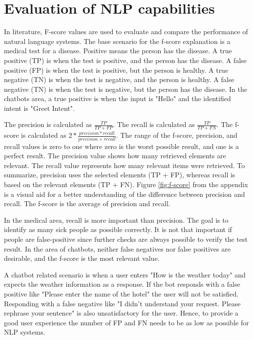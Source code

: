 \section{Evaluation of NLP capabilities}
In literature, F-score values are used to evaluate and compare the performance of natural language systems.
The base scenario for the f-score explanation is a medical test for a disease.
Positive means the person has the disease.
A true positive (TP) is when the test is positive, and the person has the disease.
A false positive (FP) is when the test is positive, but the person is healthy.
A true negative (TN) is when the test is negative, and the person is healthy.
A false negative (TN) is when the test is negative, but the person has the disease.
In the chatbots area, a true positive is when the input is "Hello" and the identified intent is "Greet Intent".

The precision is calculated as $\frac{TP}{TP + FP}$.
The recall is calculated as $\frac{TP}{TP + FN}$.
The f-score is calculated as $2 * \frac{precision * recall}{precision + recall}$.
The range of the f-score, precision, and recall values is zero to one where zero is the worst possible result, and one is a perfect result.
The precision value shows how many retrieved elements are relevant.
The recall value represents how many relevant items were retrieved.
To summarize, precision uses the selected elements (TP + FP), whereas recall is based on the relevant elements (TP + FN).
Figure \ref{fig:f-score} from the appendix is a visual aid for a better understanding of the difference between precision and recall.
The f-score is the average of precision and recall.

In the medical area, recall is more important than precision.
The goal is to identify as many sick people as possible correctly.
It is not that important if people are false-positive since further checks are always possible to verify the test result.
In the area of chatbots, neither false negatives nor false positives are desirable, and the f-score is the most relevant value.

A chatbot related scenario is when a user enters "How is the weather today" and expects the weather information as a response.
If the bot responds with a false positive like "Please enter the name of the hotel" the user will not be satisfied.
Responding with a false negative like "I didn't understand your request. Please rephrase your sentence" is also unsatisfactory for the user.
Hence, to provide a good user experience the number of FP and FN needs to be as low as possible for NLP systems.


